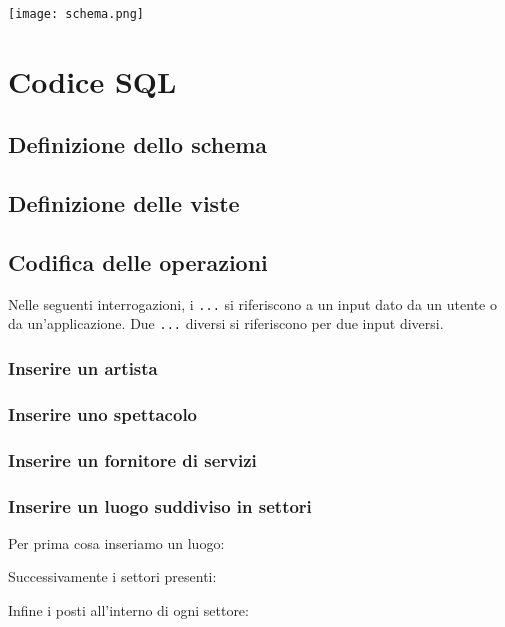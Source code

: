 \documentclass[a4paper,11pt]{article}
\begin{document}
\texttt{[image: schema.png]}

\section{Codice SQL}

\subsection{Definizione dello schema}


\vspace*{1em}

\subsection{Definizione delle viste}


\vspace*{1em}

\subsection{Codifica delle operazioni}
Nelle seguenti interrogazioni, i \texttt{...} si riferiscono a un input dato da un utente o da un'applicazione.
Due \texttt{...} diversi si riferiscono per due input diversi.

\subsubsection{Inserire un artista}


\subsubsection{Inserire uno spettacolo}


\subsubsection{Inserire un fornitore di servizi}


\subsubsection{Inserire un luogo suddiviso in settori}

Per prima cosa inseriamo un luogo:

Successivamente i settori presenti:

Infine i posti all'interno di ogni settore:

\end{document}
